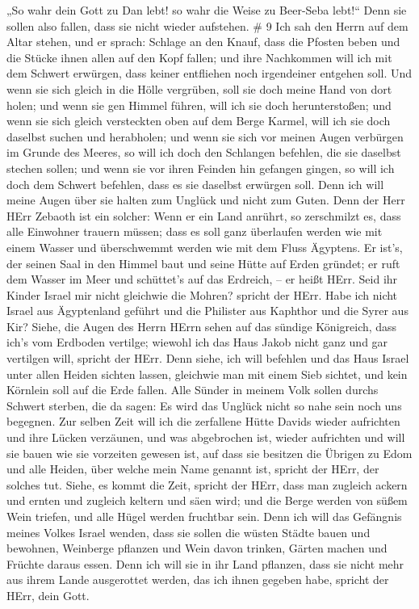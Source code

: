 „So wahr dein Gott zu Dan lebt! so wahr die Weise zu Beer-Seba lebt!{}``
Denn sie sollen also fallen, dass sie nicht wieder aufstehen. \# 9
 Ich sah den Herrn auf dem Altar stehen, und er sprach:
Schlage an den Knauf, dass die Pfosten beben und die Stücke ihnen allen
auf den Kopf fallen; und ihre Nachkommen will ich mit dem Schwert
erwürgen, dass keiner entfliehen noch irgendeiner entgehen soll.
 Und wenn sie sich gleich in die Hölle vergrüben, soll sie
doch meine Hand von dort holen; und wenn sie gen Himmel führen, will ich
sie doch herunterstoßen;  und wenn sie sich gleich
versteckten oben auf dem Berge Karmel, will ich sie doch daselbst suchen
und herabholen; und wenn sie sich vor meinen Augen verbürgen im Grunde
des Meeres, so will ich doch den Schlangen befehlen, die sie daselbst
stechen sollen;  und wenn sie vor ihren Feinden hin gefangen
gingen, so will ich doch dem Schwert befehlen, dass es sie daselbst
erwürgen soll. Denn ich will meine Augen über sie halten zum Unglück und
nicht zum Guten.  Denn der Herr HErr Zebaoth ist ein
solcher: Wenn er ein Land anrührt, so zerschmilzt es, dass alle
Einwohner trauern müssen; dass es soll ganz überlaufen werden wie mit
einem Wasser und überschwemmt werden wie mit dem Fluss Ägyptens.
 Er ist's, der seinen Saal in den Himmel baut und seine
Hütte auf Erden gründet; er ruft dem Wasser im Meer und schüttet's auf
das Erdreich, -- er heißt HErr.  Seid ihr Kinder Israel mir
nicht gleichwie die Mohren? spricht der HErr. Habe ich nicht Israel aus
Ägyptenland geführt und die Philister aus Kaphthor und die Syrer aus
Kir?  Siehe, die Augen des Herrn HErrn sehen auf das sündige
Königreich, dass ich's vom Erdboden vertilge; wiewohl ich das Haus Jakob
nicht ganz und gar vertilgen will, spricht der HErr.  Denn
siehe, ich will befehlen und das Haus Israel unter allen Heiden sichten
lassen, gleichwie man mit einem Sieb sichtet, und kein Körnlein soll auf
die Erde fallen.  Alle Sünder in meinem Volk sollen durchs
Schwert sterben, die da sagen: Es wird das Unglück nicht so nahe sein
noch uns begegnen.  Zur selben Zeit will ich die zerfallene
Hütte Davids wieder aufrichten und ihre Lücken verzäunen, und was
abgebrochen ist, wieder aufrichten und will sie bauen wie sie vorzeiten
gewesen ist,  auf dass sie besitzen die Übrigen zu Edom und
alle Heiden, über welche mein Name genannt ist, spricht der HErr, der
solches tut.  Siehe, es kommt die Zeit, spricht der HErr,
dass man zugleich ackern und ernten und zugleich keltern und säen wird;
und die Berge werden von süßem Wein triefen, und alle Hügel werden
fruchtbar sein.  Denn ich will das Gefängnis meines Volkes
Israel wenden, dass sie sollen die wüsten Städte bauen und bewohnen,
Weinberge pflanzen und Wein davon trinken, Gärten machen und Früchte
daraus essen.  Denn ich will sie in ihr Land pflanzen, dass
sie nicht mehr aus ihrem Lande ausgerottet werden, das ich ihnen gegeben
habe, spricht der HErr, dein Gott.
